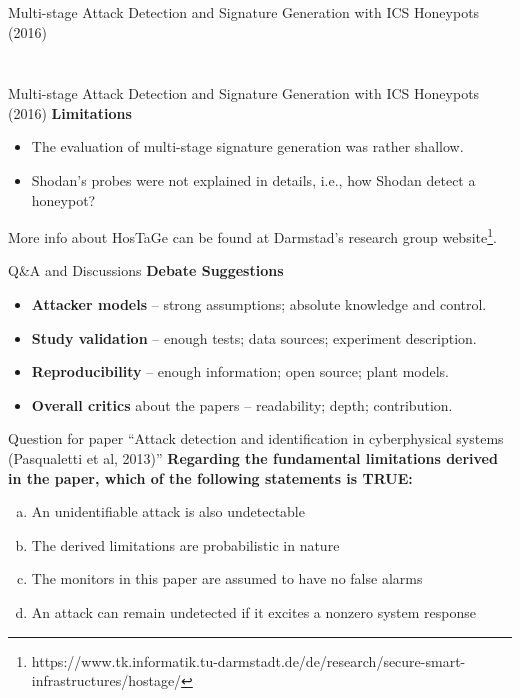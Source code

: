 \documentclass[compress]{beamer}
\begin{document}
\begin{frame}{Multi-stage Attack Detection and Signature Generation with ICS Honeypots (2016)}
\begin{columns}
\begin{column}{0.45\textwidth}
\begin{figure}
      \label{fig:hostage-ip-sources}
      \end{figure}
     \end{column}
    \end{columns}
\end{frame}
\begin{frame}{Multi-stage Attack Detection and Signature Generation with ICS Honeypots (2016)}
    \textbf{Limitations}
    \begin{itemize}
     \item The evaluation of multi-stage signature generation was rather shallow.
     \item Shodan's probes were not explained in details, i.e., how Shodan detect a honeypot?
    \end{itemize}
    More info about HosTaGe can be found at Darmstad's research group website\footnote{https://www.tk.informatik.tu-darmstadt.de/de/research/secure-smart-infrastructures/hostage/}.
\end{frame}

\begin{frame}{Q\&A and Discussions}
      \textbf{Debate Suggestions}
      \begin{itemize}
       \item \textbf{Attacker models} \cite{pasqualetti2013attack,genge2015system} -- strong assumptions; absolute knowledge and control.
       \item \textbf{Study validation} -- enough tests; data sources; experiment description.
       \item \textbf{Reproducibility} -- enough information; open source; plant models.
       \item \textbf{Overall critics} about the papers -- readability; depth; contribution.
      \end{itemize}

\end{frame}

\begin{frame}{Question for paper ``Attack detection and identification in
    cyberphysical systems (Pasqualetti et al, 2013)''}
    \textbf{Regarding the fundamental limitations derived in the paper, which of
the following statements is TRUE:}
      \begin{enumerate}[(a)]
       \item
           An unidentifiable attack is also undetectable
       \item
            The derived limitations are probabilistic in nature
       \item
           The monitors in this paper are assumed to have no false alarms
       \item
           An attack can remain undetected if it excites a nonzero system
           response
      \end{enumerate}
\end{frame}
\end{document}

